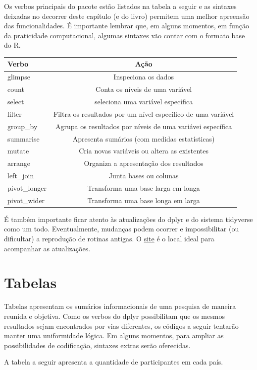 \documentclass[
]{book}
\newenvironment{Shaded}{\begin{snugshade}}{\end{snugshade}}
\newcommand{\DataTypeTok}[1]{\textcolor[rgb]{0.13,0.29,0.53}{#1}}
\newcommand{\DecValTok}[1]{\textcolor[rgb]{0.00,0.00,0.81}{#1}}
\newcommand{\KeywordTok}[1]{\textcolor[rgb]{0.13,0.29,0.53}{\textbf{#1}}}
\newcommand{\NormalTok}[1]{#1}
\newcommand{\OperatorTok}[1]{\textcolor[rgb]{0.81,0.36,0.00}{\textbf{#1}}}
\newcommand{\StringTok}[1]{\textcolor[rgb]{0.31,0.60,0.02}{#1}}
\begin{document}
Os verbos principais do pacote estão listados na tabela a seguir e as sintaxes deixadas no decorrer deste capítulo (e do livro) permitem uma melhor apreensão das funcionalidades. É importante lembrar que, em alguns momentos, em função da praticidade computacional, algumas sintaxes vão contar com o formato base do R.

\begin{longtable}[]{@{}lc@{}}
\toprule
Verbo & Ação\tabularnewline
\midrule
\endhead
glimpse & Inspeciona os dados\tabularnewline
count & Conta os níveis de uma variável\tabularnewline
select & seleciona uma variável específica\tabularnewline
filter & Filtra os resultados por um nível específico de uma variável\tabularnewline
group\_by & Agrupa os resultados por níveis de uma variávei específica\tabularnewline
summarise & Apresenta sumários (com medidas estatísticas)\tabularnewline
mutate & Cria novas variáveis ou altera as existentes\tabularnewline
arrange & Organiza a apresentação dos resultados\tabularnewline
left\_join & Junta bases ou colunas\tabularnewline
pivot\_longer & Transforma uma base larga em longa\tabularnewline
pivot\_wider & Transforma uma base longa em larga\tabularnewline
\bottomrule
\end{longtable}

É também importante ficar atento às atualizações do dplyr e do sistema tidyverse como um todo. Eventualmente, mudanças podem ocorrer e impossibilitar (ou dificultar) a reprodução de rotinas antigas. O \href{https://www.tidyverse.org/}{site} é o local ideal para acompanhar as atualizações.

\hypertarget{tabelas}{%
\section{Tabelas}\label{tabelas}}

Tabelas apresentam os sumários informacionais de uma pesquisa de maneira reunida e objetiva. Como os verbos do dplyr possibilitam que os mesmos resultados sejam encontrados por vias diferentes, os códigos a seguir tentarão manter uma uniformidade lógica. Em alguns momentos, para ampliar as possibilidades de codificação, sintaxes extras serão oferecidas.

A tabela a seguir apresenta a quantidade de participantes em cada país.

\begin{Shaded}
\end{Shaded}
\end{document}
